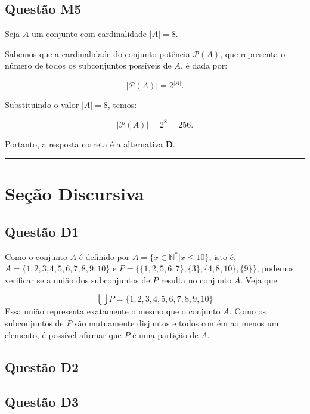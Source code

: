 \documentclass{article}
\begin{document}
\subsection{Questão M5}
Seja \( A \) um conjunto com cardinalidade \(|A| = 8\). 

Sabemos que a cardinalidade do conjunto potência \( \mathcal{P}(A) \), que representa o número de todos os subconjuntos possíveis de \( A \), é dada por:

\[
|\mathcal{P}(A)| = 2^{|A|}.
\]

Substituindo o valor \(|A| = 8\), temos:

\[
|\mathcal{P}(A)| = 2^8 = 256.
\]

Portanto, a resposta correta é a alternativa \(\mathbf{D}\).


\vspace{0.5em}
\hrule
\vspace{0.5em}

\section{Seção Discursiva}

\subsection{Questão D1}
Como o conjunto $A$ é definido por $A = \{ x \in \mathbb{N^*} | x \leq 10 \}$, isto é,
$A = \{1, 2, 3, 4, 5, 6, 7, 8, 9, 10\}$ e $P = \{\{1,2,5,6,7\},\{3\}, \{4, 8, 10\}, \{9\}\}$, podemos verificar se a união dos subconjuntos de $P$ resulta no conjunto $A$. Veja que

\[
\bigcup P = \{1, 2, 3, 4, 5, 6, 7, 8, 9, 10\}
\]
Essa união representa exatamente o mesmo que o conjunto $A$. Como os subconjuntos de $P$ são mutuamente disjuntos e todos contém ao menos um elemento, é possível afirmar que $P$ é uma partição de $A$.
\subsection{Questão D2}
\subsection{Questão D3}
\end{document}
